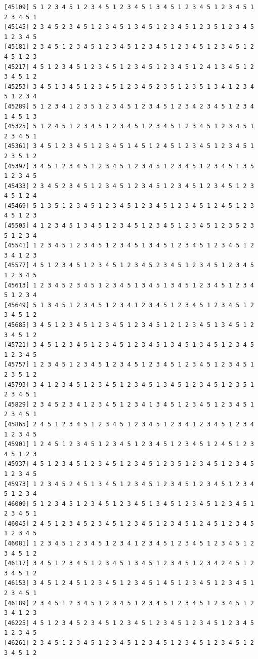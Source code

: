 \documentclass[
  english,
]{book}
\begin{document}
\begin{verbatim}
[45109] 5 1 2 3 4 5 1 2 3 4 5 1 2 3 4 5 1 3 4 5 1 2 3 4 5 1 2 3 4 5 1 2 3 4 5 1
[45145] 2 3 4 5 2 3 4 5 1 2 3 4 5 1 3 4 5 1 2 3 4 5 1 2 3 5 1 2 3 4 5 1 2 3 4 5
[45181] 2 3 4 5 1 2 3 4 5 1 2 3 4 5 1 2 3 4 5 1 2 3 4 5 1 2 3 4 5 1 2 4 5 1 2 3
[45217] 4 5 1 2 3 4 5 1 2 3 4 5 1 2 3 4 5 1 2 3 4 5 1 2 4 1 3 4 5 1 2 3 4 5 1 2
[45253] 3 4 5 1 3 4 5 1 2 3 4 5 1 2 3 4 5 2 3 5 1 2 3 5 1 3 4 1 2 3 4 5 1 2 3 4
[45289] 5 1 2 3 4 1 2 3 5 1 2 3 4 5 1 2 3 4 5 1 2 3 4 2 3 4 5 1 2 3 4 1 4 5 1 3
[45325] 5 1 2 4 5 1 2 3 4 5 1 2 3 4 5 1 2 3 4 5 1 2 3 4 5 1 2 3 4 5 1 2 3 4 5 1
[45361] 3 4 5 1 2 3 4 5 1 2 3 4 5 1 4 5 1 2 4 5 1 2 3 4 5 1 2 3 4 5 1 2 3 5 1 2
[45397] 3 4 5 1 2 3 4 5 1 2 3 4 5 1 2 3 4 5 1 2 3 4 5 1 2 3 4 5 1 3 5 1 2 3 4 5
[45433] 2 3 4 5 2 3 4 5 1 2 3 4 5 1 2 3 4 5 1 2 3 4 5 1 2 3 4 5 1 2 3 4 5 1 2 4
[45469] 5 1 3 5 1 2 3 4 5 1 2 3 4 5 1 2 3 4 5 1 2 3 4 5 1 2 4 5 1 2 3 4 5 1 2 3
[45505] 4 1 2 3 4 5 1 3 4 5 1 2 3 4 5 1 2 3 4 5 1 2 3 4 5 1 2 3 5 2 3 5 1 2 3 4
[45541] 1 2 3 4 5 1 2 3 4 5 1 2 3 4 5 1 3 4 5 1 2 3 4 5 1 2 3 4 5 1 2 3 4 1 2 3
[45577] 4 5 1 2 3 4 5 1 2 3 4 5 1 2 3 4 5 2 3 4 5 1 2 3 4 5 1 2 3 4 5 1 2 3 4 5
[45613] 1 2 3 4 5 2 3 4 5 1 2 3 4 5 1 3 4 5 1 3 4 5 1 2 3 4 5 1 2 3 4 5 1 2 3 4
[45649] 5 1 3 4 5 1 2 3 4 5 1 2 3 4 1 2 3 4 5 1 2 3 4 5 1 2 3 4 5 1 2 3 4 5 1 2
[45685] 3 4 5 1 2 3 4 5 1 2 3 4 5 1 2 3 4 5 1 2 1 2 3 4 5 1 3 4 5 1 2 3 4 5 1 2
[45721] 3 4 5 1 2 3 4 5 1 2 3 4 5 1 2 3 4 5 1 3 4 5 1 3 4 5 1 2 3 4 5 1 2 3 4 5
[45757] 1 2 3 4 5 1 2 3 4 5 1 2 3 4 5 1 2 3 4 5 1 2 3 4 5 1 2 3 4 5 1 2 3 5 1 2
[45793] 3 4 1 2 3 4 5 1 2 3 4 5 1 2 3 4 5 1 3 4 5 1 2 3 4 5 1 2 3 5 1 2 3 4 5 1
[45829] 2 3 4 5 2 3 4 1 2 3 4 5 1 2 3 4 1 3 4 5 1 2 3 4 5 1 2 3 4 5 1 2 3 4 5 1
[45865] 2 4 5 1 2 3 4 5 1 2 3 4 5 1 2 3 4 5 1 2 3 4 1 2 3 4 5 1 2 3 4 1 2 3 4 5
[45901] 1 2 4 5 1 2 3 4 5 1 2 3 4 5 1 2 3 4 5 1 2 3 4 5 1 2 4 5 1 2 3 4 5 1 2 3
[45937] 4 5 1 2 3 4 5 1 2 3 4 5 1 2 3 4 5 1 2 3 5 1 2 3 4 5 1 2 3 4 5 1 2 3 4 5
[45973] 1 2 3 4 5 2 4 5 1 3 4 5 1 2 3 4 5 1 2 3 4 5 1 2 3 4 5 1 2 3 4 5 1 2 3 4
[46009] 5 1 2 3 4 5 1 2 3 4 5 1 2 3 4 5 1 3 4 5 1 2 3 4 5 1 2 3 4 5 1 2 3 4 5 1
[46045] 2 4 5 1 2 3 4 5 2 3 4 5 1 2 3 4 5 1 2 3 4 5 1 2 4 5 1 2 3 4 5 1 2 3 4 5
[46081] 1 2 3 4 5 1 2 3 4 5 1 2 3 4 1 2 3 4 5 1 2 3 4 5 1 2 3 4 5 1 2 3 4 5 1 2
[46117] 3 4 5 1 2 3 4 5 1 2 3 4 5 1 3 4 5 1 2 3 4 5 1 2 3 4 2 4 5 1 2 3 4 5 1 2
[46153] 3 4 5 1 2 4 5 1 2 3 4 5 1 2 3 4 5 1 4 5 1 2 3 4 5 1 2 3 4 5 1 2 3 4 5 1
[46189] 2 3 4 5 1 2 3 4 5 1 2 3 4 5 1 2 3 4 5 1 2 3 4 5 1 2 3 4 5 1 2 3 4 1 2 3
[46225] 4 5 1 2 3 4 5 2 3 4 5 1 2 3 4 5 1 2 3 4 5 1 2 3 4 5 1 2 3 4 5 1 2 3 4 5
[46261] 2 3 4 5 1 2 3 4 5 1 2 3 4 5 1 2 3 4 5 1 2 3 4 5 1 2 3 4 5 1 2 3 4 5 1 2

\end{verbatim}
\end{document}
